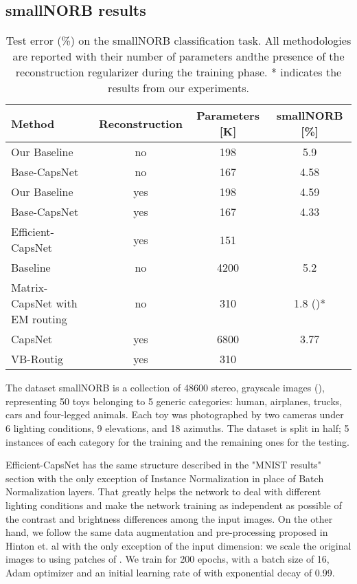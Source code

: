 \documentclass{article}
\begin{document}
\subsection{smallNORB results}
\begin{table}[h]
\centering
\begin{tabular}{lccc}
\toprule
Method                         & Reconstruction & Parameters {[}K{]} & smallNORB {[}\%{]} \\ \hline
Our Baseline                   & no             & 198                & 5.9            \\ 
Base-CapsNet                   & no             & 167                & 4.58           \\ 
Our Baseline                   & yes            & 198                & 4.59           \\ 
Base-CapsNet                   & yes            & 167                & 4.33           \\ 
Efficient-CapsNet              & yes            & 151                &   \\ \hline
Baseline \cite{hinton2018matrix}                      & no             & 4200               & 5.2            \\ 
Matrix-CapsNet with EM routing \cite{hinton2018matrix} & no             & 310                & 1.8 ()*          \\ 
CapsNet \cite{sabour2017dynamic}                        & yes            & 6800               & 3.77           \\ 
VB-Routig \cite{ribeiro2020capsule}                      & yes            & 310                &     \\ \bottomrule
\end{tabular}
\caption{Test error (\%) on the smallNORB classification task. All methodologies are reported with their number of parameters andthe presence of the reconstruction regularizer during the training phase. * indicates the results from our experiments.}
\label{tab:results_smallnorb}
\end{table}
The dataset smallNORB is a collection of 48600 stereo, grayscale images (), representing 50 toys belonging to 5 generic categories: human, airplanes, trucks, cars and four-legged animals. Each toy was photographed by two cameras under 6 lighting conditions, 9 elevations, and 18 azimuths. The dataset is split in half; 5 instances of each category for the training and the remaining ones for the testing.

Efficient-CapsNet has the same structure described in the "MNIST results" section with the only exception of Instance Normalization \cite{ulyanov2016instance} in place of Batch Normalization layers. That greatly helps the network to deal with different lighting conditions and make the network training as independent as possible of the contrast and brightness differences among the input images.
On the other hand, we follow the same data augmentation and pre-processing proposed in Hinton et. al\cite{hinton2018matrix} with the only exception of the input dimension: we scale the original images to  using patches of . We train for 200 epochs, with a batch size of 16, Adam optimizer and an initial learning rate of  with exponential decay of 0.99.
\end{document}
